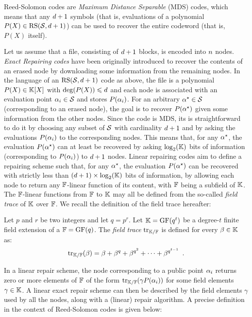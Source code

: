 \documentclass{llncs}
\begin{document}
Reed-Solomon codes are {\em Maximum Distance Separable} (MDS) codes, which means that any $\order + 1$ symbols (that is, evaluations of a polynomial $P(X)\in \RS[\pubSet,\order+1]$) can be used to recover the entire codeword (that is,
$P(X)$ itself).
\vspace{3mm}

Let us assume that a file, consisting of $\order + 1$ blocks, is encoded into $\nbShares$ nodes. {\em Exact Repairing codes} have been originally introduced to recover the contents of an erased node by downloading some information from the remaining nodes. In the language of an $\RS[\pubSet,\order+1]$ code as above, the file is a polynomial $P(X)\in \Field[X]$ with $\deg(P(X)) \leqslant \order$ and each node is associated with an evaluation point $\pubElt \in \pubSet$ and stores $P(\pubElt)$. For an arbitrary $\pubEltStar\in \pubSet$ (corresponding to an erased node), the goal is to recover $P(\pubEltStar)$ given some information from the other nodes. Since the code is MDS, its is straightforward to do it by choosing any subset of $\pubSet$ with cardinality $\order + 1$ and by asking the evaluations $P(\pubElt)$ to the corresponding nodes. This means that, for any $\pubEltStar$, the evaluation $P(\pubEltStar)$ can at least be recovered by asking $\log_2(\Field)$ bits of information (corresponding to $P(\pubElt)$) to $\order +1$ nodes. Linear repairing codes aim to define a repairing scheme such that, for any $\pubEltStar$, the evaluation $P(\pubEltStar)$ can be recovered with strictly less than $(\order + 1)\times \log_2(\Field)$ bits of information, by allowing each node to return any $\FField$-linear function of its content, with $\FField$ being a subfield of $\Field$. The $\FField$-linear functions from $\FField$ to $\Field$ may all be defined from the so-called {\em field trace} of $\Field$ over $\FField$. We recall the definition of the field trace hereafter:

\begin{definition}
Let $p$ and $r$ be two integers and let $q=p^r$. Let $\Field=\GF(q^t)$ be a degree-$t$ finite field extension of a $\FField=\GF(q)$. The {\em field trace} $\myTrace$ is defined for every $\beta \in \Field$ as:
\begin{equation}\label{equ:trace}
\myTrace(\beta) = \beta + \beta^q + \beta^{q^2} + \cdots + \beta^{q^{t-1}} \enspace .
\end{equation}
\end{definition}

In a linear repair scheme, the node corresponding to a public point $\pubElt$ returns zero or more elements of $\FField$ of the form $\myTrace(\gamma P(\pubElt))$ for some field elements $\gamma \in \Field$. A linear exact repair scheme can then be described by the field elements $\gamma$ used by all the nodes, along with a (linear) repair algorithm. A precise definition in the context of Reed-Solomon codes is given below:
\end{document}
